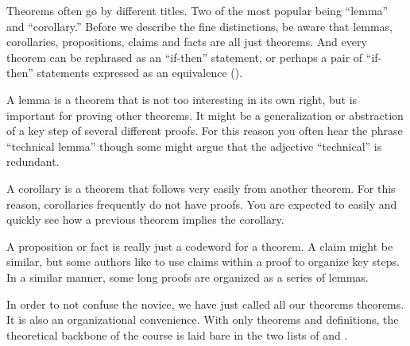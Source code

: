 Theorems often go by different titles.  Two of the most popular being ``lemma'' and ``corollary.''   Before we describe the fine distinctions, be aware that lemmas, corollaries, propositions, claims and facts are all just theorems.  And every theorem can be rephrased as an ``if-then'' statement, or perhaps a pair of ``if-then'' statements expressed as an equivalence ().\par
%
A lemma is a theorem that is not too interesting in its own right, but is important for proving other theorems.  It might be a generalization or abstraction of a key step of several different proofs.  For this reason you often hear the phrase ``technical lemma'' though some might argue that the adjective ``technical'' is redundant.\par
%
A corollary is a theorem that follows very easily from another theorem.  For this reason, corollaries frequently do not have proofs.  You are expected to easily and quickly see how a previous theorem implies the corollary.\par
%
A proposition or fact is really just a codeword for a theorem.  A claim might be similar, but some authors like to use claims within a proof to organize key steps.  In a similar manner, some long proofs are organized as a series of lemmas.\par
%
In order to not confuse the novice, we have just called all our theorems theorems.  It is also an organizational convenience.  With only theorems and definitions, the theoretical backbone of the course is laid bare in the two lists of  and .
